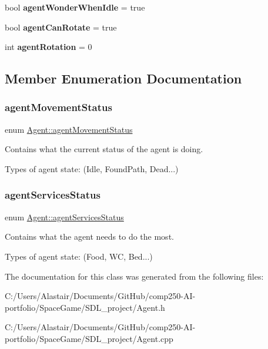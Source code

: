 \begin{DoxyCompactItemize}
\mbox{\label{class_agent_af3384cfb4c86b2ca093ad02a4ce57d37}} 
bool {\bfseries agent\+Wonder\+When\+Idle} = true
\item 
\mbox{\label{class_agent_ab150cbcd976d2c50b1f34503c3a98168}} 
bool {\bfseries agent\+Can\+Rotate} = true
\item 
\mbox{\label{class_agent_a02a2a7245b8677b8bcdf3bd311f5a420}} 
int {\bfseries agent\+Rotation} = 0
\end{DoxyCompactItemize}


\subsection{Member Enumeration Documentation}
\mbox{\label{class_agent_af0b2c4596f7df623b5912509a09d0449}} 
\subsubsection{\texorpdfstring{agent\+Movement\+Status}{agentMovementStatus}}
{\footnotesize\ttfamily enum \hyperlink{class_agent_af0b2c4596f7df623b5912509a09d0449}{Agent\+::agent\+Movement\+Status}}



Contains what the current status of the agent is doing. 

Types of agent state\+: (Idle, Found\+Path, Dead...) \mbox{\label{class_agent_ac7c6344403211868f101f7903fa9cb82}} 
\subsubsection{\texorpdfstring{agent\+Services\+Status}{agentServicesStatus}}
{\footnotesize\ttfamily enum \hyperlink{class_agent_ac7c6344403211868f101f7903fa9cb82}{Agent\+::agent\+Services\+Status}}



Contains what the agent needs to do the most. 

Types of agent state\+: (Food, WC, Bed...) 

The documentation for this class was generated from the following files\+:\begin{DoxyCompactItemize}
\item 
C\+:/\+Users/\+Alastair/\+Documents/\+Git\+Hub/comp250-\/\+A\+I-\/portfolio/\+Space\+Game/\+S\+D\+L\+\_\+project/Agent.\+h\item 
C\+:/\+Users/\+Alastair/\+Documents/\+Git\+Hub/comp250-\/\+A\+I-\/portfolio/\+Space\+Game/\+S\+D\+L\+\_\+project/Agent.\+cpp\end{DoxyCompactItemize}
